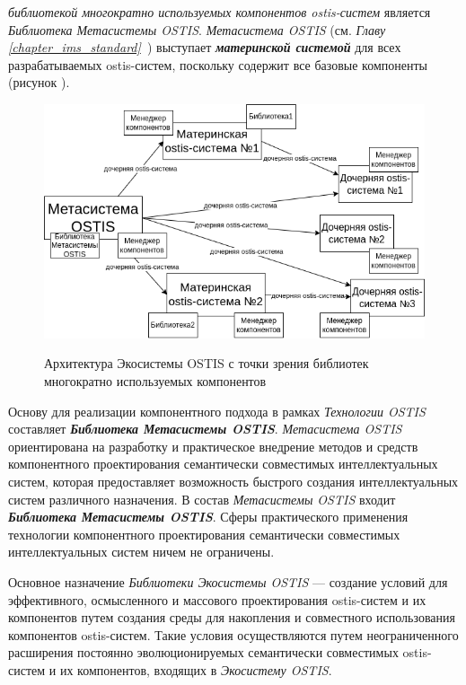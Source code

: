  \textit{библиотекой многократно используемых компонентов ostis-систем} является \textit{Библиотека Метасистемы OSTIS}. \textit{Метасистема OSTIS} (см. \textit{Главу \ref{chapter_ims_standard}~}) выступает \textbf{\textit{материнской системой}} для всех разрабатываемых ostis-систем, поскольку содержит все базовые компоненты (рисунок \textit{}).

\begin{figure}[H]
	\caption{Архитектура Экосистемы OSTIS с точки зрения библиотек многократно используемых компонентов}
	\includegraphics[scale=0.8]{author/part5/figures/ecosystem_architecture.png}
	\label{fig:ecosystem_architecture}
\end{figure}

Основу для реализации компонентного подхода в рамках \textit{Технологии OSTIS} составляет \textbf{\textit{Библиотека Метасистемы OSTIS}}. \textit{Метасистема OSTIS} ориентирована на разработку и практическое внедрение методов и средств компонентного проектирования семантически совместимых интеллектуальных систем, которая предоставляет возможность быстрого создания интеллектуальных систем различного назначения. В состав \textit{Метасистемы OSTIS} входит \textbf{\textit{Библиотека Метасистемы OSTIS}}. Сферы практического применения технологии компонентного проектирования семантически совместимых интеллектуальных систем ничем не ограничены.

Основное назначение \textit{Библиотеки Экосистемы OSTIS} --- создание условий для эффективного, осмысленного и массового проектирования ostis-систем и их компонентов путем создания среды для накопления и совместного использования компонентов ostis-систем. Такие условия осуществляются путем неограниченного расширения постоянно эволюционируемых семантически совместимых ostis-систем и их компонентов, входящих в \textit{Экосистему OSTIS}.

